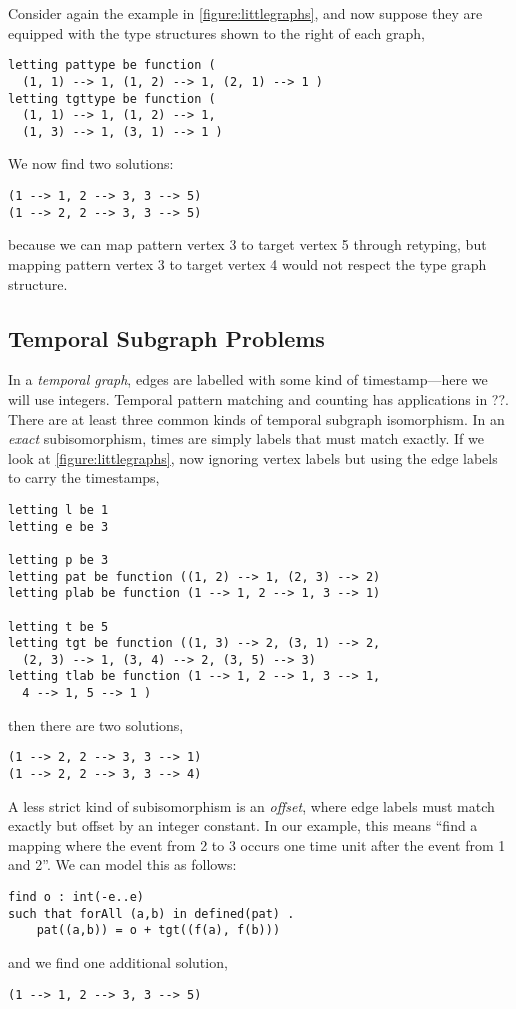 \documentclass[runningheads]{llncs}
\begin{document}
Consider again the example in \cref{figure:littlegraphs}, and now suppose they are equipped with the type
structures shown to the right of each graph,
\begin{lstlisting}
letting pattype be function (
  (1, 1) --> 1, (1, 2) --> 1, (2, 1) --> 1 )
letting tgttype be function (
  (1, 1) --> 1, (1, 2) --> 1,
  (1, 3) --> 1, (3, 1) --> 1 )
\end{lstlisting}
We now find two solutions:
\begin{lstlisting}
(1 --> 1, 2 --> 3, 3 --> 5)
(1 --> 2, 2 --> 3, 3 --> 5)
\end{lstlisting}
because we can map pattern vertex 3 to target vertex 5 through retyping, but mapping pattern vertex 3
to target vertex 4 would not respect the type graph structure.

\subsection{Temporal Subgraph Problems}\label{section:temporalgraphs}

In a \emph{temporal graph}, edges are labelled with some kind of timestamp---here we will use
integers. Temporal pattern matching and counting has applications in ??. There are at least three
common kinds of temporal subgraph isomorphism. In an \emph{exact} subisomorphism, times are simply
labels that must match exactly. If we look at \cref{figure:littlegraphs}, now ignoring vertex labels
but using the edge labels to carry the timestamps,
\begin{lstlisting}
letting l be 1
letting e be 3

letting p be 3
letting pat be function ((1, 2) --> 1, (2, 3) --> 2)
letting plab be function (1 --> 1, 2 --> 1, 3 --> 1)

letting t be 5
letting tgt be function ((1, 3) --> 2, (3, 1) --> 2,
  (2, 3) --> 1, (3, 4) --> 2, (3, 5) --> 3)
letting tlab be function (1 --> 1, 2 --> 1, 3 --> 1,
  4 --> 1, 5 --> 1 )
\end{lstlisting}
then there are two solutions,
\begin{lstlisting}
(1 --> 2, 2 --> 3, 3 --> 1)
(1 --> 2, 2 --> 3, 3 --> 4)
\end{lstlisting}

A less strict kind of subisomorphism is an \emph{offset}, where edge labels must match exactly but
offset by an integer constant. In our example, this means ``find a mapping where the event from 2
to 3 occurs one time unit after the event from 1 and 2''. We can model this as follows:
\begin{lstlisting}
find o : int(-e..e)
such that forAll (a,b) in defined(pat) .
    pat((a,b)) = o + tgt((f(a), f(b)))
\end{lstlisting}
and we find one additional solution,
\begin{lstlisting}
(1 --> 1, 2 --> 3, 3 --> 5)
\end{lstlisting}
\end{document}
